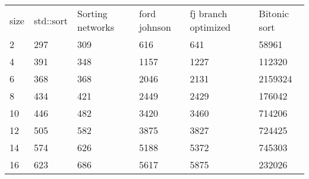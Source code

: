 \begin{tabular}{|l|l|l|l|l|l|}\hline
	size&std::sort&Sorting networks&ford johnson&fj branch optimized&Bitonic sort\hline\\
	2&297&309&616&641&58961\\\hline
	4&391&348&1157&1227&112320\\\hline
	6&368&368&2046&2131&2159324\\\hline
	8&434&421&2449&2429&176042\\\hline
	10&446&482&3420&3460&714206\\\hline
	12&505&582&3875&3827&724425\\\hline
	14&574&626&5188&5372&745303\\\hline
	16&623&686&5617&5875&232026\\\hline
\end{tabular}